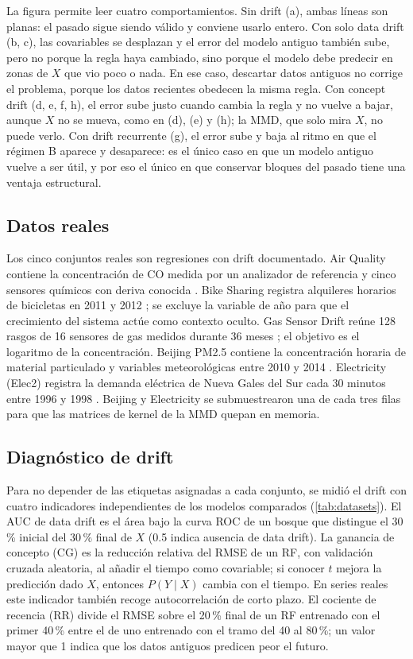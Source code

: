 \documentclass[11pt,a4paper]{article}
\begin{document}
La figura permite leer cuatro comportamientos. Sin drift (a), ambas líneas son planas: el pasado
sigue siendo válido y conviene usarlo entero. Con solo data drift (b, c), las covariables se desplazan
y el error del modelo antiguo también sube, pero no porque la regla haya cambiado, sino porque el
modelo debe predecir en zonas de $X$ que vio poco o nada. En ese caso, descartar datos antiguos no
corrige el problema, porque los datos recientes obedecen la misma regla. Con concept drift (d, e, f,
h), el error sube justo cuando cambia la regla y no vuelve a bajar, aunque $X$ no se mueva, como en
(d), (e) y (h); la MMD, que solo mira $X$, no puede verlo. Con drift recurrente (g), el error sube y
baja al ritmo en que el régimen B aparece y desaparece: es el único caso en que un modelo antiguo
vuelve a ser útil, y por eso el único en que conservar bloques del pasado tiene una ventaja
estructural.

\subsection{Datos reales}

Los cinco conjuntos reales son regresiones con drift documentado. Air Quality contiene la
concentración de CO medida por un analizador de referencia y cinco sensores químicos con deriva
conocida \parencite{devito2008}. Bike Sharing registra alquileres horarios de bicicletas en 2011 y 2012
\parencite{fanaee2014}; se excluye la variable de año para que el crecimiento del sistema actúe como
contexto oculto. Gas Sensor Drift reúne 128 rasgos de 16 sensores de gas medidos durante 36 meses
\parencite{vergara2012}; el objetivo es el logaritmo de la concentración. Beijing PM2.5 contiene la
concentración horaria de material particulado y variables meteorológicas entre 2010 y 2014
\parencite{liang2015}. Electricity (Elec2) registra la demanda eléctrica de Nueva Gales del Sur cada 30
minutos entre 1996 y 1998 \parencite{harries1999}. Beijing y Electricity se submuestrearon una de
cada tres filas para que las matrices de kernel de la MMD quepan en memoria.

\subsection{Diagnóstico de drift}

Para no depender de las etiquetas asignadas a cada conjunto, se midió el drift con cuatro indicadores
independientes de los modelos comparados (\cref{tab:datasets}). El AUC de data drift es el área bajo
la curva ROC de un bosque que distingue el 30\,\% inicial del 30\,\% final de $X$ (0.5 indica ausencia
de data drift). La ganancia de concepto (CG) es la reducción relativa del RMSE de un RF, con
validación cruzada aleatoria, al añadir el tiempo como covariable; si conocer $t$ mejora la predicción
dado $X$, entonces $P(Y\mid X)$ cambia con el tiempo. En series reales este indicador también recoge
autocorrelación de corto plazo. El cociente de recencia (RR) divide el RMSE sobre el 20\,\% final de
un RF entrenado con el primer 40\,\% entre el de uno entrenado con el tramo del 40 al 80\,\%; un valor
mayor que 1 indica que los datos antiguos predicen peor el futuro.
\end{document}
